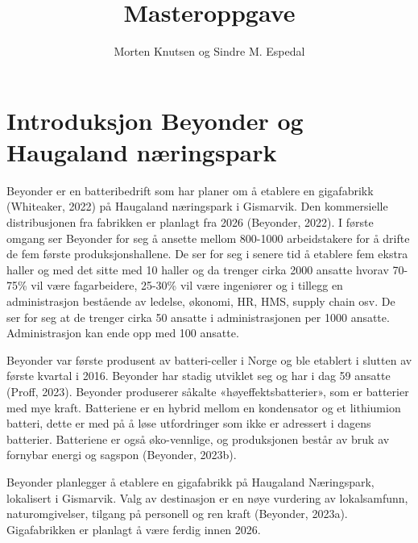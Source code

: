 \documentclass[
]{article}
\title{Masteroppgave}
\author{Morten Knutsen og Sindre M. Espedal}
\date{}
\begin{document}
\maketitle
\ifdefined\Shaded\renewenvironment{Shaded}{\begin{tcolorbox}[interior hidden, boxrule=0pt, breakable, sharp corners, borderline west={3pt}{0pt}{shadecolor}, enhanced, frame hidden]}{\end{tcolorbox}}\fi

\hypertarget{introduksjon-beyonder-og-haugaland-nuxe6ringspark}{%
\section{Introduksjon Beyonder og Haugaland
næringspark}\label{introduksjon-beyonder-og-haugaland-nuxe6ringspark}}

Beyonder er en batteribedrift som har planer om å etablere en
gigafabrikk (Whiteaker, 2022) på Haugaland næringspark i Gismarvik. Den
kommersielle distribusjonen fra fabrikken er planlagt fra 2026
(Beyonder, 2022). I første omgang ser Beyonder for seg å ansette mellom
800-1000 arbeidstakere for å drifte de fem første produksjonshallene. De
ser for seg i senere tid å etablere fem ekstra haller og med det sitte
med 10 haller og da trenger cirka 2000 ansatte hvorav 70-75\% vil være
fagarbeidere, 25-30\% vil være ingeniører og i tillegg en administrasjon
bestående av ledelse, økonomi, HR, HMS, supply chain osv. De ser for seg
at de trenger cirka 50 ansatte i administrasjonen per 1000 ansatte.
Administrasjon kan ende opp med 100 ansatte.

Beyonder var første produsent av batteri-celler i Norge og ble etablert
i slutten av første kvartal i 2016. Beyonder har stadig utviklet seg og
har i dag 59 ansatte (Proff, 2023). Beyonder produserer såkalte
«høyeffektsbatterier», som er batterier med mye kraft. Batteriene er en
hybrid mellom en kondensator og et lithiumion batteri, dette er med på å
løse utfordringer som ikke er adressert i dagens batterier. Batteriene
er også øko-vennlige, og produksjonen består av bruk av fornybar energi
og sagspon (Beyonder, 2023b).

Beyonder planlegger å etablere en gigafabrikk på Haugaland Næringspark,
lokalisert i Gismarvik. Valg av destinasjon er en nøye vurdering av
lokalsamfunn, naturomgivelser, tilgang på personell og ren kraft
(Beyonder, 2023a). Gigafabrikken er planlagt å være ferdig innen 2026.
\end{document}
